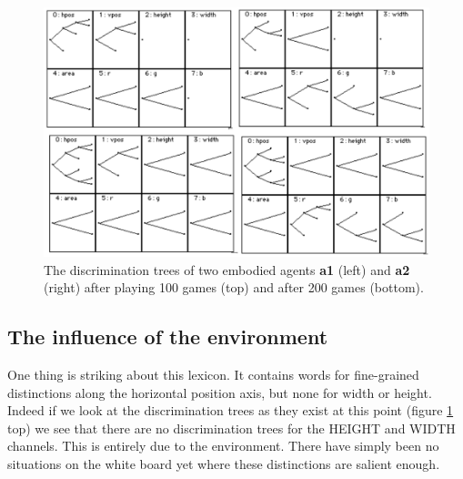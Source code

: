 \begin{figure}[htbp]
  \centerline{\includegraphics[width=.75\textwidth]{chap7/figs/discri200}}
\caption{ \label{discri200} The discrimination trees 
of two embodied agents {\bf a1} (left) and {\bf a2} (right) 
after playing 100 games (top) and after 200 games (bottom).}
\end{figure}

\subsection{The influence of the environment}

One thing is striking about this lexicon. It contains
words for fine-grained distinctions along the 
horizontal position axis, but none for width or 
height. Indeed if we look at the discrimination
trees as they exist at this point (figure 
\ref{discri200} top) we see that there are no 
discrimination trees for the HEIGHT and WIDTH
channels. This is entirely due to the 
environment. There have simply been no situations on 
the white board yet where these distinctions are salient 
enough. 


